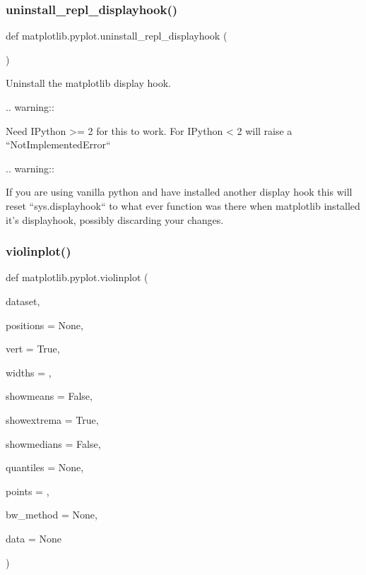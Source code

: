 \subsubsection{\texorpdfstring{uninstall\+\_\+repl\+\_\+displayhook()}{uninstall\_repl\_displayhook()}}
{\footnotesize\ttfamily def matplotlib.\+pyplot.\+uninstall\+\_\+repl\+\_\+displayhook (\begin{DoxyParamCaption}{ }\end{DoxyParamCaption})}

\begin{DoxyVerb}Uninstall the matplotlib display hook.

.. warning::

   Need IPython >= 2 for this to work.  For IPython < 2 will raise a
   ``NotImplementedError``

.. warning::

   If you are using vanilla python and have installed another
   display hook this will reset ``sys.displayhook`` to what ever
   function was there when matplotlib installed it's displayhook,
   possibly discarding your changes.
\end{DoxyVerb}
 \mbox{\label{namespacematplotlib_1_1pyplot_a37b968e899a6133fbec616a62f3754e1}} 
\subsubsection{\texorpdfstring{violinplot()}{violinplot()}}
{\footnotesize\ttfamily def matplotlib.\+pyplot.\+violinplot (\begin{DoxyParamCaption}\item[{}]{dataset,  }\item[{}]{positions = {\ttfamily None},  }\item[{}]{vert = {\ttfamily True},  }\item[{}]{widths = {},  }\item[{}]{showmeans = {\ttfamily False},  }\item[{}]{showextrema = {\ttfamily True},  }\item[{}]{showmedians = {\ttfamily False},  }\item[{}]{quantiles = {\ttfamily None},  }\item[{}]{points = {},  }\item[{}]{bw\+\_\+method = {\ttfamily None},  }\item[{}]{data = {\ttfamily None} }\end{DoxyParamCaption})}

